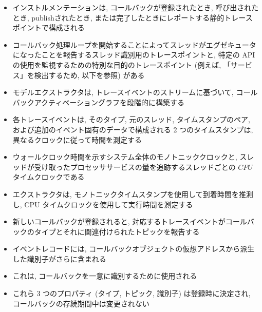 \begin{frame}{}
    \begin{itemize}
        \item インストルメンテーションは, コールバックが登録されたとき, 呼び出されたとき, publishされたとき, または完了したときにレポートする静的トレースポイントで構成される
\item コールバック処理ループを開始することによってスレッドがエグゼキュータになったことを報告するスレッド識別用のトレースポイントと, 特定の API の使用を監視するための特別な目的のトレースポイント (例えば, 「サービス」を検出するため, 以下を参照) がある
    \end{itemize}
\end{frame}

\begin{frame}{}
    \begin{itemize}
        \item モデルエクストラクタは, トレースイベントのストリームに基づいて, コールバックアクティベーショングラフを段階的に構築する
\item 各トレースイベントは, そのタイプ, 元のスレッド, タイムスタンプのペア, および追加のイベント固有のデータで構成される 2 つのタイムスタンプは, 異なるクロックに従って時間を測定する
\item ウォールクロック時間を示すシステム全体のモノトニッククロックと, スレッドが受け取ったプロセッササービスの量を追跡するスレッドごとの $C P U$ タイムクロックである
\item エクストラクタは, モノトニックタイムスタンプを使用して到着時間を推測し, CPU タイムクロックを使用して実行時間を測定する
    \end{itemize}
\end{frame}

\begin{frame}{}
    \begin{itemize}
        \item 新しいコールバックが登録されると, 対応するトレースイベントがコールバックのタイプとそれに関連付けられたトピックを報告する
\item イベントレコードには, コールバックオブジェクトの仮想アドレスから派生した識別子がさらに含まれる
\item これは, コールバックを一意に識別するために使用される
\item これら 3 つのプロパティ (タイプ, トピック, 識別子) は登録時に決定され, コールバックの存続期間中は変更されない
    \end{itemize}
\end{frame}

